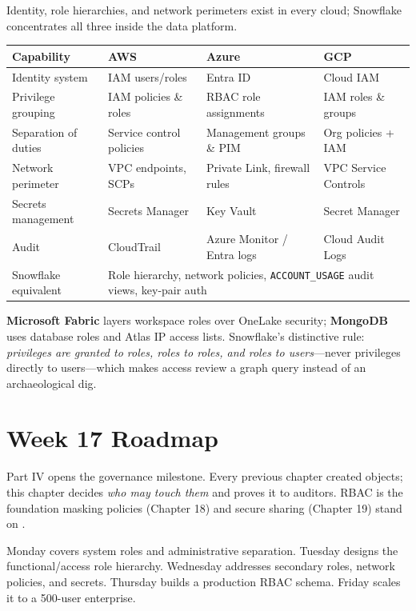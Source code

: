 \begin{crosscloud}
Identity, role hierarchies, and network perimeters exist in every cloud; Snowflake concentrates all three inside the data platform.

\vspace{2mm}
{\footnotesize
\begin{tabular}{@{}p{2.8cm}p{3.0cm}p{3.0cm}p{3.0cm}@{}}
\toprule
\textbf{Capability} & \textbf{AWS} & \textbf{Azure} & \textbf{GCP} \\
\midrule
Identity system & IAM users/roles & Entra ID & Cloud IAM \\
Privilege grouping & IAM policies \& roles & RBAC role assignments & IAM roles \& groups \\
Separation of duties & Service control policies & Management groups \& PIM & Org policies + IAM \\
Network perimeter & VPC endpoints, SCPs & Private Link, firewall rules & VPC Service Controls \\
Secrets management & Secrets Manager & Key Vault & Secret Manager \\
Audit & CloudTrail & Azure Monitor / Entra logs & Cloud Audit Logs \\
\addlinespace
Snowflake equivalent & \multicolumn{3}{l}{Role hierarchy, network policies, \texttt{ACCOUNT\_USAGE} audit views, key-pair auth} \\
\bottomrule
\end{tabular}}

\vspace{1mm}
\textbf{Microsoft Fabric} layers workspace roles over OneLake security; \textbf{MongoDB} uses database roles and Atlas IP access lists. Snowflake's distinctive rule: \emph{privileges are granted to roles, roles to roles, and roles to users}---never privileges directly to users---which makes access review a graph query instead of an archaeological dig.
\end{crosscloud}

\section{Week 17 Roadmap}
Part IV opens the governance milestone. Every previous chapter created objects; this chapter decides \emph{who may touch them} and proves it to auditors. RBAC is the foundation masking policies (Chapter 18) and secure sharing (Chapter 19) stand on \cite{snowflakeAccessControlDocs}.

Monday covers system roles and administrative separation. Tuesday designs the functional/access role hierarchy. Wednesday addresses secondary roles, network policies, and secrets. Thursday builds a production RBAC schema. Friday scales it to a 500-user enterprise.


